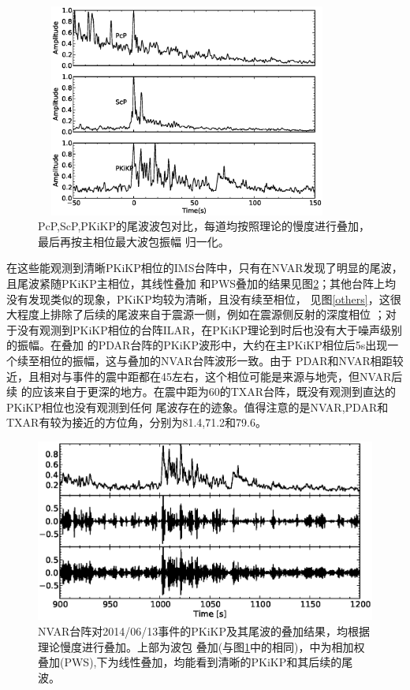 \begin{figure}
	\centering
	\includegraphics[width=10cm,height=7cm]{fig/chap3/nvar_env.eps}
	\caption{PcP,ScP,PKiKP的尾波波包对比，每道均按照理论的慢度进行叠加，最后再按主相位最大波包振幅%
归一化。}
	\label{nvar_env}
\end{figure}

在这些能观测到清晰PKiKP相位的IMS台阵中，只有在NVAR发现了明显的尾波，且尾波紧随PKiKP主相位，其线性叠加
和PWS叠加的结果见图\ref{nvar_mul}；其他台阵上均没有发现类似的现象，PKiKP均较为清晰，且没有续至相位，
见图\ref{others}，这很大程度上排除了后续的尾波来自于震源一侧，例如在震源侧反射的深度相位
；对于没有观测到PKiKP相位的台阵ILAR，在PKiKP理论到时后也没有大于噪声级别的振幅。在叠加
的PDAR台阵的PKiKP波形中，大约在主PKiKP相位后5s出现一个续至相位的振幅，这与叠加的NVAR台阵波形一致。由于
PDAR和NVAR相距较近，且相对与事件的震中距都在45{\textdegree}左右，这个相位可能是来源与地壳，但NVAR后续
的应该来自于更深的地方。在震中距为60{\textdegree}的TXAR台阵，既没有观测到直达的PKiKP相位也没有观测到任何
尾波存在的迹象。值得注意的是NVAR,PDAR和TXAR有较为接近的方位角，分别为81.4{\textdegree},71.2{\textdegree}和79.6{\textdegree}。

\begin{figure}
	\centering
	\includegraphics[width=12cm,height=6cm]{fig/chap3/nvar_mul.eps}
	\caption{NVAR台阵对2014/06/13事件的PKiKP及其尾波的叠加结果，均根据理论慢度进行叠加。上部为波包%
叠加(与图\ref{nvar_env}中的相同)，中为相加权叠加(PWS),下为线性叠加，均能看到清晰的PKiKP和其后续的尾波。}
	\label{nvar_mul}
\end{figure}


